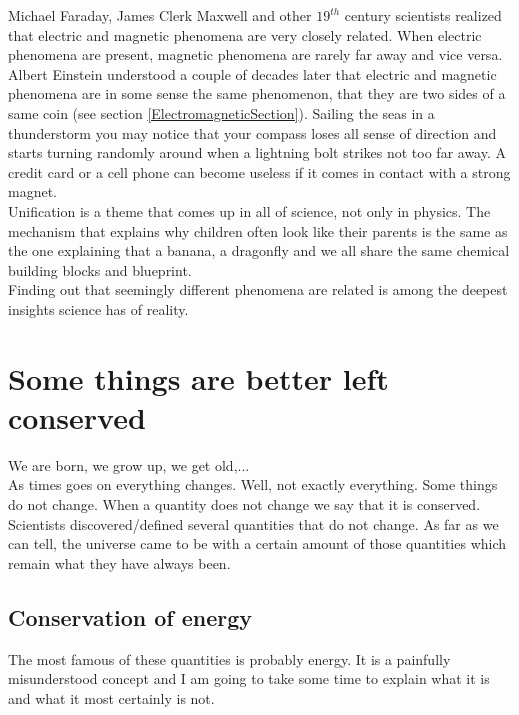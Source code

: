 \noindent Michael Faraday, James Clerk Maxwell and other $19^{th}$ century scientists realized that electric and magnetic phenomena are very closely related. When electric phenomena are present, magnetic phenomena are rarely far away and vice versa. Albert Einstein understood a couple of decades later that electric and magnetic phenomena are in some sense the same phenomenon, that they are two sides of a same coin (see section \ref{ElectromagneticSection}). Sailing the seas in a thunderstorm you may notice that your compass loses all sense of direction and starts turning randomly around when a lightning bolt strikes not too far away. A credit card or a cell phone can become useless if it comes in contact with a strong magnet.\\

\noindent Unification is a theme that comes up in all of science, not only in physics. The mechanism that explains why children often look like their parents is the same as the one explaining that a banana, a dragonfly and we all share the same chemical building blocks and blueprint.\\

\noindent Finding out that seemingly different phenomena are related is among the deepest insights science has of reality.

\section{Some things are better left conserved}

\noindent We are born, we grow up, we get old,...\\
As times goes on everything changes. Well, not exactly everything. Some things do not change. When a quantity does not change we say that it is conserved. Scientists discovered/defined several quantities that do not change. As far as we can tell, the universe came to be with a certain amount of those quantities which remain what they have always been.

\subsection{Conservation of energy}

\noindent The most famous of these quantities is probably energy. It is a painfully misunderstood concept and I am going to take some time to explain what it is and what it most certainly is not.\\


